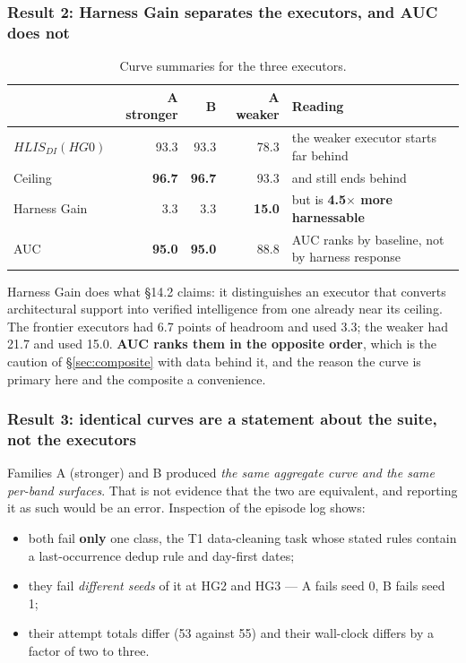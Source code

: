 \documentclass[11pt]{article}
\theoremstyle{definition}
\begin{document}
\subsubsection{Result 2: Harness Gain separates the executors, and AUC does not}

\begin{table}[!htbp]
\centering\small
\begin{tabularx}{\textwidth}{@{}lrrrY@{}}
\toprule
& A stronger & B & A weaker & Reading \\
\midrule
$HLIS_{DI}(HG0)$ & 93.3 & 93.3 & 78.3 & the weaker executor starts far behind \\
Ceiling & \textbf{96.7} & \textbf{96.7} & 93.3 & and still ends behind \\
Harness Gain & 3.3 & 3.3 & \textbf{15.0} & but is \textbf{4.5$\times$ more harnessable} \\
AUC & \textbf{95.0} & \textbf{95.0} & 88.8 & AUC ranks by baseline, not by harness response \\
\bottomrule
\end{tabularx}
\caption{Curve summaries for the three executors.}
\label{tab:curvesummary}
\end{table}

Harness Gain does what \S14.2 claims: it distinguishes an executor that converts architectural support into verified intelligence from one already near its ceiling. The frontier executors had 6.7 points of headroom and used 3.3; the weaker had 21.7 and used 15.0. \textbf{AUC ranks them in the opposite order}, which is the caution of \S\ref{sec:composite} with data behind it, and the reason the curve is primary here and the composite a convenience.

\subsubsection{Result 3: identical curves are a statement about the suite, not the executors}

Families A (stronger) and B produced \emph{the same aggregate curve and the same per-band surfaces}. That is not evidence that the two are equivalent, and reporting it as such would be an error. Inspection of the episode log shows:

\begin{itemize}
\item both fail \textbf{only} one class, the T1 data-cleaning task whose stated rules contain a last-occurrence dedup rule and day-first dates;
\item they fail \emph{different seeds} of it at HG2 and HG3 --- A fails seed 0, B fails seed 1;
\item their attempt totals differ (53 against 55) and their wall-clock differs by a factor of two to three.
\end{itemize}
\end{document}
